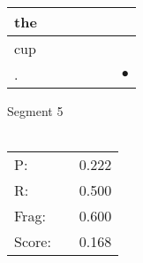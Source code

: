 \documentclass[landscape]{article}
\newcommand{\ssp}{\hspace{2pt}}
\newcommand{\mex}{\cellcolor{g}$\bullet$}
\begin{document}
\begin{tabular}{|l|p{10pt}|p{10pt}|p{10pt}|p{10pt}|p{10pt}|p{10pt}|}
\hline
\ssp the \ssp&\hspace{2pt}&\hspace{2pt}&\hspace{2pt}&\hspace{2pt}&\hspace{2pt}&\hspace{2pt}\\
\hline
\ssp cup \ssp&\hspace{2pt}&\hspace{2pt}&\hspace{2pt}&\hspace{2pt}&\hspace{2pt}&\hspace{2pt}\\
\hline
\ssp \cellcolor{ref5}. \ssp&\hspace{2pt}&\hspace{2pt}&\hspace{2pt}&\hspace{2pt}&\hspace{2pt}&\hspace{2pt}\mex\\
\hline
\end{tabular}

\vspace{6pt}
\noindent Segment 5\\\\
\noindent\begin{tabular}{lm{12pt}r}
\hline
P:&&0.222\\
R:&&0.500\\
Frag:&&0.600\\
Score:&&0.168\\
\end{tabular}

\newpage
\end{document}
